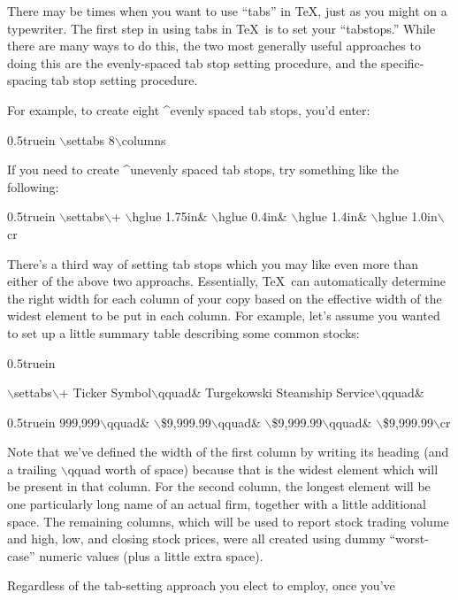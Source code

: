 There may be times when you want to use ``tabs'' in \TeX{}, just as
you might on a typewriter. The first step in using tabs in \TeX\ 
is to set your ``tabstops.'' While there are many ways to do this,
the two most generally useful approaches to doing this are the
evenly-spaced tab stop setting procedure, and the specific-spacing
tab stop setting procedure.
\bigskip\par\noindent
For example, to create eight ^{evenly spaced tab stops}, you'd enter:
\bigskip\par\noindent\hglue 0.5truein
{\twltt $\backslash$settabs 8$\backslash$columns}
\bigskip\par\noindent
If you need to create ^{unevenly spaced tab stops}, try something like
the following:
\bigskip\par\noindent\hglue 0.5truein
{\twltt $\backslash$settabs$\backslash$+%
$\backslash$hglue 1.75in\&%
$\backslash$hglue 0.4in\&%
$\backslash$hglue 1.4in\&%
$\backslash$hglue 1.0in$\backslash$cr}
\bigskip\par\noindent
There's a third way of setting tab stops which you may like even 
more than either of the above two approachs. Essentially, \TeX\ 
can automatically determine the right width for each column of 
your copy based on the effective width of the widest element
to be put in each column. For example, let's assume you wanted to
set up a little summary table describing some common stocks: 
\bigskip\par\noindent\hglue 0.5truein
{\twltt $\backslash$settabs$\backslash$+%
Ticker Symbol$\backslash$qquad\&%
Turgekowski Steamship Service$\backslash$qquad\&
\par\noindent\hglue 0.5truein
999,999$\backslash$qquad\&%
$\backslash$\$9,999.99$\backslash$qquad\&%
$\backslash$\$9,999.99$\backslash$qquad\&%
$\backslash$\$9,999.99$\backslash$cr}
\bigskip\par\noindent
Note that we've defined the width of the first column by writing its
heading (and a trailing {\twltt $\backslash$qquad} worth of space)
because that is the widest element which will be present in that column.
For the second column, the longest element will be one particularly long
name of an actual firm, together with a little additional space.
The remaining columns, which will be used to report stock trading volume
and high, low, and closing stock prices, were all created using dummy
``worst-case'' numeric values (plus a little extra space).
\bigskip\par\noindent
Regardless of the tab-setting approach you elect to employ, once you've
